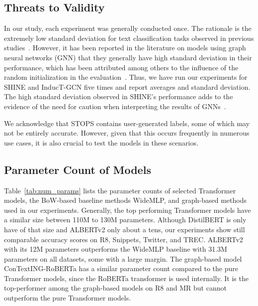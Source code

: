 \documentclass[runningheads]{llncs}
\begin{document}
\subsection{Threats to Validity}
\label{sec:threattovalidity}

In our study, each experiment was generally conducted once.
The rationale is the extremely low standard deviation for text classification tasks observed in previous studies~\cite{galkeMLP,zhao2021sequential,liu2021deep}.
However, it has been reported in the literature on models using graph neural networks (GNN) that they generally have high standard deviation in their performance, which has been attributed among others to the influence of the random initialization in the evaluation~\cite{pitfallsShchur2018}. 
Thus, we have run our experiments for SHINE and InducT-GCN five times and report averages and standard deviation. 
The high standard deviation observed in SHINE's performance adds to the evidence of the need for caution when interpreting the results of \acp{GNN}~\cite{pitfallsShchur2018}.

 We acknowledge that STOPS contains user-generated labels, some of which may not be entirely accurate. However, given that this occurs frequently in numerous use cases, it is also crucial to test the models in these scenarios.

\subsection{Parameter Count of Models}
Table~\ref{tab:num_params} lists the parameter counts of selected Transformer models, the BoW-based baseline methods WideMLP, and graph-based methods used in our experiments.
Generally, the top performing Transformer models have a similar size between 110M to 130M parameters. 
Although DistilBERT is only have of that size and ALBERTv2 only about a tens, our experiments show still comparable accuracy scores on R8, Snippets, Twitter, and TREC.
ALBERTv2 with its 12M parameters outperforms the WideMLP baseline with 31.3M parameters on all datasets, some with a large margin.
The graph-based model ConTextING-RoBERTa has a similar parameter count compared to the pure Transformer models, since the RoBERTa transformer is used internally.
It is the top-performer among the graph-based models on R8 and MR but cannot outperform the pure Transformer models.
\end{document}
